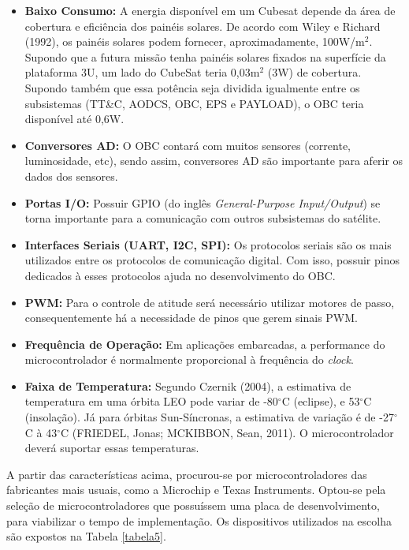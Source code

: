 \begin{itemize}
	\item \textbf{Baixo Consumo:}
	A energia disponível em um Cubesat depende da área de cobertura e eficiência dos painéis solares. De acordo com  Wiley e Richard (1992), os painéis solares podem fornecer, aproximadamente, 100W/m$^2$. Supondo que a futura missão tenha painéis solares fixados na superfície da plataforma 3U, um lado do CubeSat teria 0,03m$^2$ (3W) de cobertura. Supondo também que essa potência seja dividida igualmente entre os subsistemas (TT\&C, AODCS, OBC, EPS e PAYLOAD), o OBC teria disponível até 0,6W.
	
	\item \textbf{Conversores AD:}
	O OBC contará com muitos sensores (corrente, luminosidade, etc), sendo assim, conversores AD são importante para aferir os dados dos sensores. 
	
	\item \textbf{Portas I/O:}
	Possuir GPIO (do inglês \textit{General-Purpose Input/Output}) se torna importante para a comunicação com outros subsistemas do satélite. 
	
	\item \textbf{Interfaces Seriais (UART, I2C, SPI):}
	Os protocolos seriais são os mais utilizados entre os protocolos de comunicação digital. Com isso, possuir pinos dedicados à esses protocolos ajuda no desenvolvimento do OBC.
	
	\item \textbf{PWM:}
	Para o controle de atitude será necessário utilizar motores de passo, consequentemente há a necessidade de pinos que gerem sinais PWM.
	
	\item \textbf{Frequência de Operação:}
	Em aplicações embarcadas, a performance do microcontrolador é normalmente proporcional à frequência do \textit{clock}.
	
	\item \textbf{Faixa de Temperatura:}
	Segundo Czernik (2004), a estimativa de temperatura em uma órbita LEO pode variar de -80$^{\circ}$C (eclipse), e 53$^{\circ}$C (insolação). Já para órbitas Sun-Síncronas, a estimativa de variação é de -27$^{\circ}$C à 43$^{\circ}$C (FRIEDEL, Jonas; MCKIBBON, Sean, 2011). O microcontrolador deverá suportar essas temperaturas.
\end{itemize}

A partir das características acima, procurou-se por microcontroladores das fabricantes mais usuais, como a Microchip e Texas Instruments. Optou-se pela seleção de microcontroladores que possuíssem uma placa de desenvolvimento, para viabilizar o tempo de implementação. Os dispositivos utilizados na escolha são expostos na Tabela \ref{tabela5}.

